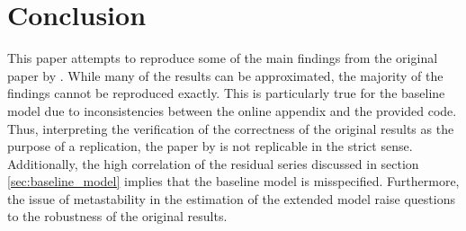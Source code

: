 \section{Conclusion}
\label{sec:conclusion}

This paper attempts to reproduce some of the main findings from the original paper by \citeauthor{JERMANNfinancial}. While many of the results can be approximated, the majority of the findings cannot be reproduced exactly. This is particularly true for the baseline model due to inconsistencies between the online appendix and the provided code. Thus, interpreting the verification of the correctness of the original results as the purpose of a replication, the paper by \citeauthor{JERMANNfinancial} is not replicable in the strict sense. Additionally, the high correlation of the residual series discussed in section \ref{sec:baseline_model} implies that the baseline model is misspecified. Furthermore, the issue of metastability in the estimation of the extended model raise questions to the robustness of the original results.
